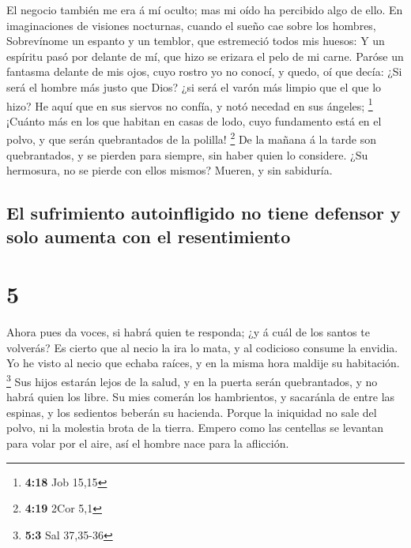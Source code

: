  El negocio también me era á mí oculto; mas mi oído ha
percibido algo de ello.  En imaginaciones de visiones
nocturnas, cuando el sueño cae sobre los hombres, 
Sobrevínome un espanto y un temblor, que estremeció todos mis huesos:
 Y un espíritu pasó por delante de mí, que hizo se erizara
el pelo de mi carne.  Paróse un fantasma delante de mis
ojos, cuyo rostro yo no conocí, y quedo, oí que decía:  ¿Si
será el hombre más justo que Dios? ¿si será el varón más limpio que el
que lo hizo?  He aquí que en sus siervos no confía, y notó
necedad en sus ángeles; \footnote{\textbf{4:18} Job 15,15} 
¡Cuánto más en los que habitan en casas de lodo, cuyo fundamento está en
el polvo, y que serán quebrantados de la polilla! \footnote{\textbf{4:19}
  2Cor 5,1}  De la mañana á la tarde son quebrantados, y se
pierden para siempre, sin haber quien lo considere.  ¿Su
hermosura, no se pierde con ellos mismos? Mueren, y sin sabiduría.

\hypertarget{el-sufrimiento-autoinfligido-no-tiene-defensor-y-solo-aumenta-con-el-resentimiento}{%
\subsection{El sufrimiento autoinfligido no tiene defensor y solo
aumenta con el
resentimiento}\label{el-sufrimiento-autoinfligido-no-tiene-defensor-y-solo-aumenta-con-el-resentimiento}}

\hypertarget{section-4}{%
\section{5}\label{section-4}}

 Ahora pues da voces, si habrá quien te responda; ¿y á cuál
de los santos te volverás?  Es cierto que al necio la ira lo
mata, y al codicioso consume la envidia.  Yo he visto al
necio que echaba raíces, y en la misma hora maldije su habitación.
\footnote{\textbf{5:3} Sal 37,35-36}  Sus hijos estarán
lejos de la salud, y en la puerta serán quebrantados, y no habrá quien
los libre.  Su mies comerán los hambrientos, y sacaránla de
entre las espinas, y los sedientos beberán su hacienda. 
Porque la iniquidad no sale del polvo, ni la molestia brota de la
tierra.  Empero como las centellas se levantan para volar
por el aire, así el hombre nace para la aflicción.

